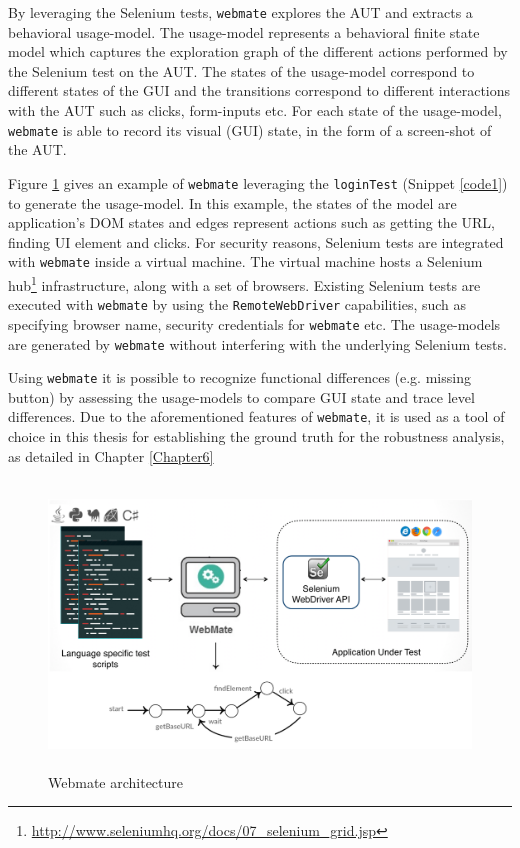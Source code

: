 By leveraging the Selenium tests, \texttt{webmate} explores the AUT and extracts a behavioral usage-model. The usage-model represents a behavioral finite state model which captures the exploration graph of the different actions performed by the Selenium test on the AUT. The states of the usage-model correspond to different states of the GUI and the transitions correspond to different interactions with the AUT such as clicks, form-inputs etc. For each state of the usage-model, \texttt{webmate} is able to record its visual (GUI) state, in the form of a screen-shot of the AUT.

Figure \ref{fig:webmateArchitecture} gives an example of \texttt{webmate} leveraging the \texttt{loginTest} (Snippet \ref{code1}) to generate the usage-model. In this example, the states of the model are application's DOM states and edges represent actions such as getting the URL, finding UI element and clicks. For security reasons, Selenium tests are integrated with \texttt{webmate} inside a virtual machine. The virtual machine hosts a Selenium hub\footnote{\url{http://www.seleniumhq.org/docs/07_selenium_grid.jsp}} infrastructure, along with a set of browsers. Existing Selenium tests are executed with \texttt{webmate} by using the \texttt{RemoteWebDriver} capabilities, such as specifying browser name, security credentials for \texttt{webmate} etc. The usage-models are generated by \texttt{webmate} without interfering with the underlying Selenium tests. 

Using \texttt{webmate} it is possible to recognize functional differences (e.g. missing button) by assessing the usage-models to compare GUI state and trace level differences. Due to the aforementioned features of \texttt{webmate}, it is used as a tool of choice in this thesis for establishing the ground truth for the robustness analysis, as detailed in Chapter \ref{Chapter6}

\begin{figure}
\makeatletter 
\makeatother
    \centering
  \includegraphics[width=5.5in,height=3in]{./Figures/webmate-state-graph}
  \caption{Webmate architecture}
  \label{fig:webmateArchitecture} 
\end{figure}

